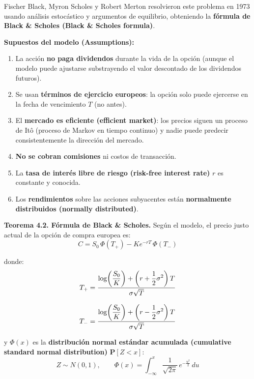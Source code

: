 \documentclass[12pt]{article}
\begin{document}
Fischer Black, Myron Scholes y Robert Merton resolvieron este problema en 1973 usando an\'alisis estoc\'astico y argumentos de equilibrio, obteniendo la \textbf{f\'ormula de Black \& Scholes (Black \& Scholes formula)}.

\textbf{Supuestos del modelo (Assumptions):}
\begin{enumerate}
  \item La acci\'on \textbf{no paga dividendos} durante la vida de la opci\'on (aunque el modelo puede ajustarse substrayendo el valor descontado de los dividendos futuros).
  \item Se usan \textbf{t\'erminos de ejercicio europeos}: la opci\'on solo puede ejercerse en la fecha de vencimiento $T$ (no antes).
  \item El \textbf{mercado es eficiente (efficient market)}: los precios siguen un proceso de It\^o (proceso de Markov en tiempo continuo) y nadie puede predecir consistentemente la direcci\'on del mercado.
  \item \textbf{No se cobran comisiones} ni costos de transacci\'on.
  \item La \textbf{tasa de inter\'es libre de riesgo (risk-free interest rate)} $r$ es constante y conocida.
  \item Los \textbf{rendimientos} sobre las acciones subyacentes est\'an \textbf{normalmente distribuidos (normally distributed)}.
\end{enumerate}

\textbf{Teorema 4.2. F\'ormula de Black \& Scholes.} Seg\'un el modelo, el precio justo actual de la opci\'on de compra europea es:
\begin{equation}
  C = S_0\,\Phi(T_+) - K e^{-rT}\,\Phi(T_-)
\end{equation}

donde:
\begin{align}
  T_+ &= \frac{\displaystyle\log\!\left(\frac{S_0}{K}\right) + \left(r + \frac{1}{2}\sigma^2\right)T}{\sigma\sqrt{T}} \notag\\[8pt]
  T_- &= \frac{\displaystyle\log\!\left(\frac{S_0}{K}\right) + \left(r - \frac{1}{2}\sigma^2\right)T}{\sigma\sqrt{T}} \notag
\end{align}

y $\Phi(x)$ es la \textbf{distribuci\'on normal est\'andar acumulada (cumulative standard normal distribution)} $\mathbf{P}[Z < x]$:
\begin{equation}
  Z \sim N(0,1), \qquad \Phi(x) = \int_{-\infty}^{x} \frac{1}{\sqrt{2\pi}}\, e^{-\frac{u^2}{2}}\, du
\end{equation}
\end{document}
